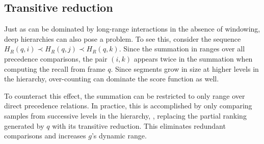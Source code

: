 \documentclass{article}
\begin{document}
\subsection{Transitive reduction}
\label{sec:transitive}

Just as  can be dominated by long-range interactions in the absence of windowing, deep hierarchies can also pose a problem.
To see this, consider the sequence $H_R(q, i) \prec H_R(q, j) \prec H_R(q, k)$.
Since the summation in  ranges over all precedence comparisons, the pair $(i, k)$ appears twice in the summation when computing the recall from frame $q$.  
Since segments grow in size at higher levels in the hierarchy, over-counting can dominate the score function as well.

To counteract this effect, the summation can be restricted to only range over direct precedence relations.
In practice, this is accomplished by only comparing samples from successive levels in the hierarchy, \ie, 
replacing the partial ranking generated by $q$ with its transitive reduction.
This eliminates redundant comparisons and increases $g$'s dynamic range.




\end{document}
